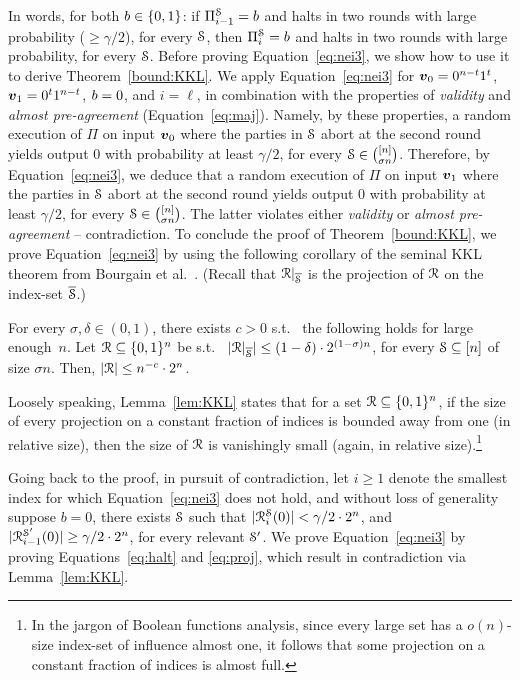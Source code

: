 \noindent
In words, for both $b\in \{0,1\}$: if $\Pi_{i-1}^{\mathcal{S}}=b$ and halts in two rounds with large probability ($\ge \gamma/2$), for every $\mathcal{S}$, then $\Pi_i^{\mathcal{S}}=b$ and halts in two rounds with large probability, for every $\mathcal{S}$. Before proving Equation~\ref{eq:nei3}, we show how to use it to derive Theorem~\ref{bound:KKL}. We apply Equation~\ref{eq:nei3} for
${ \boldsymbol{v}}_0=0^{n-t}1^{t}$, ${ \boldsymbol{v}}_1=0^{t}1^{n-t}$, $b=0$, and $i=\ell$, in combination with the properties of \emph{validity} and \emph{almost pre-agreement}
(Equation~\ref{eq:maj}). Namely, by these properties,
a random execution of $\Pi$ on input ${ \boldsymbol{v}}_0$ where the parties in $\mathcal{S}$ abort at the second round yields output $0$ with probability at least $\gamma/2$, for every $\mathcal{S}\in {\binom{[n]}{\sigma n}}$.
Therefore, by Equation~\ref{eq:nei3},
we deduce that a random execution of $\Pi$ on input ${ \boldsymbol{v}}_1$ where the parties in $\mathcal{S}$ abort at the second round yields output $0$ with probability at least $\gamma/2$, for every $\mathcal{S}\in {\binom{[n]}{\sigma n}}$. The latter violates either \emph{validity} or \emph{almost pre-agreement} -- contradiction.
To conclude the proof of Theorem~\ref{bound:KKL}, we prove Equation~\ref{eq:nei3} by using the following corollary of the seminal KKL theorem \cite{KKL88} from Bourgain et al.~\cite{BKK14}.
(Recall that $\mathcal{R}|_{\overline{\mathcal{S}}}$ is the projection of $\mathcal{R}$ on the index-set $\overline{\mathcal{S}}$.)

\begin{lemma}\label{lem:KKL} For every $\sigma, \delta\in (0,1)$, there exists $c>0$ s.t.\
the following holds for large enough~$n$. Let $\mathcal{R} \subseteq {\{0,1\}^n}$ be s.t.\
$|\mathcal{R}|_{\overline{\mathcal{S}}}|\le (1-\delta)\cdot 2^{(1-\sigma)n}$, for every $\mathcal{S}\subseteq [n]$ of size $\sigma n$. Then, $\left|\mathcal{R}\right|\le n^{-c}\cdot 2^n$.
\end{lemma}

Loosely speaking, Lemma~\ref{lem:KKL} states that for a set $\mathcal{R}\subseteq {\{0,1\}^n}$, if the size of every projection on a constant fraction of indices is bounded away from one (in relative size), then the size of $\mathcal{R}$ is vanishingly small
(again, in relative size).\footnote{In the jargon of Boolean functions analysis, since every large set has a $o(n)$-size index-set of influence almost one, it follows that some projection on a constant fraction of indices is almost full.}

Going back to the proof, in pursuit of contradiction, let $i\ge 1$ denote the smallest index for which Equation~\ref{eq:nei3} does not hold, and without loss of generality suppose $b=0$, \ie there exists $\mathcal{S}$ such that $|\mathcal{R}_{i}^{\mathcal{S}}(0)|< \gamma/2 \cdot 2^{n}$, and $|\mathcal{R}_{i-1}^{\mathcal{S}'}(0)|\ge \gamma/2 \cdot 2^n$, for every relevant $\mathcal{S}'$. We prove Equation~\ref{eq:nei3} by proving Equations~\ref{eq:halt} and \ref{eq:proj}, which result in contradiction via Lemma~\ref{lem:KKL}.

